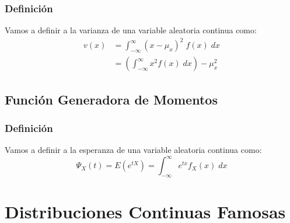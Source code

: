 \documentclass[12pt, fleqn]{report}                             %
\theoremstyle{break}                                            %
\newcommand{\Wrap}[1]{\left( #1 \right)}                        %
\begin{document}
            \subsection{Definición}

                Vamos a definir a la varianza de una variable aleatoria continua como:
                \begin{align*}
                    v(x) 
                        &= \int_{-\infty}^\infty (x - \mu_x)^2 \; f(x) \; dx       \\
                        &= \Wrap{\int_{-\infty}^\infty x^2 f(x) \; dx} - \mu_x^2
                \end{align*}


        \vspace{1em}
        \section{Función Generadora de Momentos}

            \subsection{Definición}

                Vamos a definir a la esperanza de una variable aleatoria continua como:
                \begin{equation*}
                    \Psi_X (t) = E(e^{tX}) = \int_{-\infty}^\infty  e^{tx} f_X (x) \; dx
                \end{equation*}



    \chapter{Distribuciones Continuas Famosas}
\end{document}
